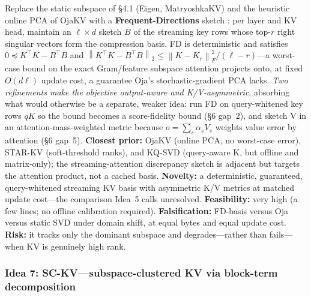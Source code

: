 \documentclass[10pt]{article}
\newcommand{\norm}[1]{\left\lVert #1\right\rVert}
\newcommand{\term}[1]{\textbf{\color{accent!85!black}#1}}
\begin{document}
Replace the static subspace of \S4.1 (Eigen, MatryoshkaKV) and the heuristic online PCA of OjaKV
with a \term{Frequent-Directions} sketch \cite{fd_liberty,fd_ghashami}: per layer and KV head,
maintain an $\ell\times d$ sketch $B$ of the streaming key rows whose top-$r$ right singular
vectors form the compression basis. FD is deterministic and satisfies
$0\preceq K^\top K-B^\top B$ and $\norm{K^\top K-B^\top B}_2\le\norm{K-K_r}_F^2/(\ell-r)$---a
worst-case bound on the exact Gram/feature subspace attention projects onto, at fixed $O(d\ell)$
update cost, a guarantee Oja's stochastic-gradient PCA lacks. \emph{Two refinements make the
objective output-aware and K/V-asymmetric}, absorbing what would otherwise be a separate, weaker
idea: run FD on query-whitened key rows $qK$ so the bound becomes a score-fidelity bound
(\S6 gap~2), and sketch V in an attention-mass-weighted metric because $o=\sum_s\alpha_sV_s$
weights value error by attention (\S6 gap~5). \term{Closest prior:} OjaKV (online PCA, no
worst-case error), STAR-KV (soft-threshold ranks), and KQ-SVD (query-aware K, but offline and
matrix-only); the streaming-attention discrepancy sketch \cite{streamattn} is adjacent but targets
the attention product, not a cached basis. \term{Novelty:} a deterministic, guaranteed,
query-whitened streaming KV basis with asymmetric K/V metrics at matched update cost---the
comparison Idea~5 calls unresolved. \term{Feasibility:} very high (a few lines; no offline
calibration required). \term{Falsification:} FD-basis versus Oja versus static SVD under domain
shift, at equal bytes and equal update cost. \term{Risk:} it tracks only the dominant subspace and
degrades---rather than fails---when KV is genuinely high rank.

\subsubsection*{Idea 7: SC-KV---subspace-clustered KV via block-term decomposition}
\end{document}
